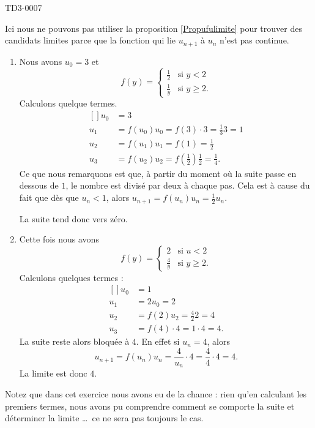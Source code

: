 
\begin{corrige}{TD3-0007}

	Ici nous ne pouvons pas utiliser la proposition \ref{Propufulimite} pour trouver des candidats limites parce que la fonction qui lie $u_{n+1}$ à $u_n$ n'est pas continue.
	\begin{enumerate}
		\item
			Nous avons $u_0=3$ et
			\begin{equation}
				f(y)=\begin{cases}
					\frac{ 1 }{2}	&	\text{si $y<2$}\\
					\frac{1}{ y }	&	 \text{si $y\geq 2$}.
				\end{cases}
			\end{equation}
			Calculons quelque termes.		
			\begin{equation}
				\begin{aligned}[]
					u_0&=3\\
					u_1&=f(u_0)u_0=f(3)\cdot 3=\frac{1}{ 3 }3=1\\
					u_2&=f(u_1)u_1=f(1)=\frac{ 1 }{2}\\
					u_3&=f(u_2)u_2=f(\frac{ 1 }{2})\frac{ 1 }{2}=\frac{1}{ 4 }.
				\end{aligned}
			\end{equation}
			Ce que nous remarquons est que, à partir du moment où la suite passe en dessous de $1$, le nombre est divisé par deux à chaque pas. Cela est à cause du fait que dès que $u_n<1$, alors $u_{n+1}=f(u_n)u_n=\frac{ 1 }{2}u_n$.

			La suite tend donc vers zéro.
		\item
			Cette fois nous avons
			\begin{equation}
				f(y)=\begin{cases}
					2	&	\text{si $u<2$}\\
					\frac{ 4 }{ y }	&	 \text{si $y\geq 2$.}
				\end{cases}
			\end{equation}
			Calculons quelques termes :
			\begin{equation}
				\begin{aligned}[]
					u_0&=1\\
					u_1&=2u_0=2\\
					u_2&=f(2)u_2=\frac{ 4 }{ 2 }2=4\\
					u_3&=f(4)\cdot 4=1\cdot 4=4.
				\end{aligned}
			\end{equation}
			La suite reste alors bloquée à $4$. En effet si $u_n=4$, alors
			\begin{equation}
				u_{n+1}=f(u_n)u_n=\frac{ 4 }{ u_n }\cdot 4=\frac{ 4 }{ 4 }\cdot 4=4.
			\end{equation}
			La limite est donc $4$.
	\end{enumerate}
	
	Notez que dans cet exercice nous avons eu de la chance : rien qu'en calculant les premiers termes, nous avons pu comprendre comment se comporte la suite et déterminer la limite \ldots\ ce ne sera pas toujours le cas.

\end{corrige}
